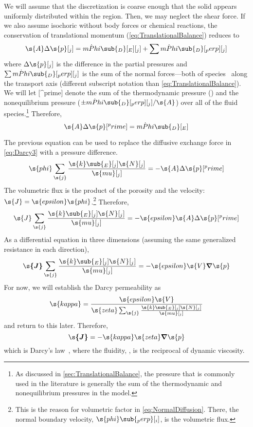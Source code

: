 We will assume that the discretization is coarse enough that the solid appears uniformly distributed within the region.  Then, we may neglect the shear force.  If we also assume isochoric  without body forces or chemical reactions, the conservation of translational momentum (\autoref{eq:TranslationalBalance}) reduces to
\begin{equation}
  \s{A}\Delta\s{p}[_j] = \dot{mPhi}\sub{_D}[_E][_j] + \sum\dot{mPhi}\sub{_D}[_perp][_j]
\end{equation}
where $\Delta\s{p}[_j]$ is the difference in the partial pressures and $\sum\dot{mPhi}\sub{_D}[_perp][_j]$ is the sum of the normal forces---both of species~ along the transport axis (different subscript notation than \autoref{eq:TranslationalBalance}).  We will let [^prime] denote the sum of the thermodynamic pressure () and the nonequilibrium pressure ($\pm\dot{mPhi}\sub{_D}[_perp][_j]/\s{A}$) over all of the fluid species.\footnote{As discussed in \autoref{sec:TranslationalBalance}, the pressure that is commonly used in the literature is generally the sum of the thermodynamic and nonequilibrium pressures in the model.}  Therefore,
\begin{equation}
  \label{}
  \s{A}\Delta\s{p}[^prime] = \dot{mPhi}\sub{_D}[_E]
\end{equation}

The previous equation can be used to replace the diffusive exchange force in \autoref{eq:Darcy3} with a pressure difference.
\begin{equation}
  \label{eq:Darcy4}
  \s{phi}\sum_{\s{j}}\frac{\s{k}\sub{_E}[_j]\s{N}[_j]}{\s{mu}[_j]} = -\s{A}\Delta\s{p}[^prime]
\end{equation}
The volumetric flux is the product of the porosity and the velocity:  $\s{J} = \s{epsilon}\s{phi}$.\footnote{This is the reason for volumetric factor in \autoref{eq:NormalDiffusion}.  There, the normal boundary velocity, $\s{phi}\sub{_perp}[_i]$, is the volumetric flux.}  Therefore,
\begin{equation}
  \s{J}\sum_{\s{j}}\frac{\s{k}\sub{_E}[_j]\s{N}[_j]}{\s{mu}[_j]} = -\s{epsilon}\s{A}\Delta\s{p}[^prime]
\end{equation}
As a differential equation in three dimensions (assuming the same generalized resistance in each direction),
\begin{equation}
  \boldsymbol{\s{J}}\sum_{\s{j}}\frac{\s{k}\sub{_E}[_j]\s{N}[_j]}{\s{mu}[_j]} = -\s{epsilon}\s{V}\boldsymbol{\nabla}\s{p}
\end{equation}
For now, we will establish the Darcy permeability as
\begin{equation}
  \label{eq:Permeability1}
  \s{kappa} = \frac{\s{epsilon}\s{V}}{\s{zeta}\sum_{\s{j}}\frac{\s{k}\sub{_E}[_j]\s{N}[_j]}{\s{mu}[_j]}}
\end{equation}
and return to this later.  Therefore,
\begin{equation}
  \boldsymbol{\s{J}} = -\s{kappa}\s{zeta}\boldsymbol{\nabla}\s{p}
\end{equation}
which is Darcy's law~\cite{Bird2002, Weber2004ChemRev}, %
where the fluidity, , is the reciprocal of dynamic viscosity.

